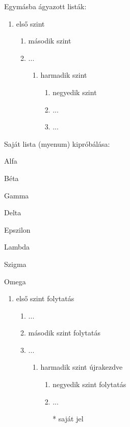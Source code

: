 \documentclass{article}
\begin{document}
Egymásba ágyazott listák:
\begin{enumerate}
\item első szint
\begin{enumerate}[series=level2,label=\arabic*.]
	\item második szint
	\item ...
	\begin{enumerate}
		\item harmadik szint
		\begin{enumerate}[series=level4]
			\item negyedik szint
			\item ...
			\item ...
		\end{enumerate}
	\end{enumerate}
\end{enumerate}
\end{enumerate}
Saját lista (myenum) kipróbálása:
\begin{myenum}
\item Alfa
\begin{myenum}
	\item Béta
	\begin{myenum}
		\item Gamma
		\item Delta
		\begin{myenum}
			\item Epszilon
			\item Lambda
			\item Szigma
			\begin{myenum}
				\item Omega
			\end{myenum}
		\end{myenum}
	\end{myenum}	
\end{myenum}
\end{myenum}
\hulipsum[1-3]
\begin{enumerate}[resume]
\item első szint folytatás
\begin{enumerate}[resume*=level2]
	\item ...
	\item második szint folytatás
	\item ...
	\begin{enumerate}
		\item harmadik szint újrakezdve
		\begin{enumerate}[resume=level4]
			\item negyedik szint folytatás
			\item ...
			\item[*] saját jel
		\end{enumerate}
	\end{enumerate}
\end{enumerate}
\end{enumerate}
\end{document}
